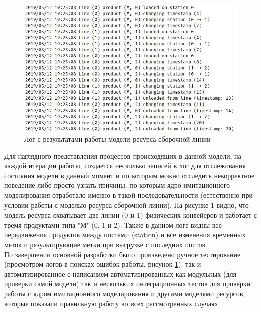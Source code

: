 \begin{figure}[ht]
	\centering
	\includegraphics[width=\linewidth]{pics/assemblyResult.png}
	\caption{Лог с результатами работы модели ресурса сборочной линии}
	\label{fig:lineResult}
\end{figure}

\indent Для наглядного представления процессов происходящих в данной модели, на каждой итерации работы, создается несколько записей в лог для отслеживания состояния модели в данный момент и по которым можно отследить некорректное поведение либо просто узнать причины, по которым ядро имитационного моделирования отработало именно в такой последовательности (естественно при условии работы с моделью ресурса сборочной линии).
На рисунке \ref{fig:lineResult} видно, что модель ресурса охватывает две линии (0 и 1) физических конвейеров и работает с тремя продуктами типа "М" (0, 1 и 2).
Также в данном логе видны все передвижения продуктов между постами (station) и все изменения временных меток и результирующие метки при выгрузке с последних постов.\\
\indent По завершении основной разработки было произведено ручное тестирование (просмотром логов в поисках ошибок работы, рисунок \ref{fig:lineResult}), так и автоматизированное с написанием автоматизированных как модульных (для проверки самой модели) так и нескольких интеграционных тестов для проверки работы с ядром имитационного моделирования и другими моделями ресурсов, которые показали правильную работу во всех рассмотренных случаях.
